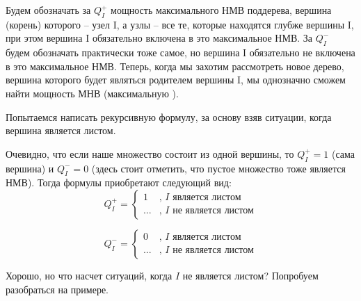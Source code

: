 \documentclass[12pt]{article}
\begin{document}
 Будем обозначать за $Q_{I}^+$ мощность максимального НМВ поддерева, вершина (корень) 
 которого -- узел I, а узлы -- все те, которые находятся глубже вершины I, при этом 
 вершина I обязательно включена в это максимальное НМВ. За $Q_{I}^-$ будем обозначать практически тоже самое,
 но вершина I обязательно не включена в это максимальное НМВ. Теперь, когда мы захотим рассмотреть новое дерево, вершина которого будет являться родителем вершины I, мы однозначно сможем найти мощность МНВ (максимальную ).

 Попытаемся написать рекурсивную формулу, за основу взяв ситуации, когда вершина является листом.

 Очевидно, что если наше множество состоит из одной вершины, то $Q_{I}^+ = 1$ (сама вершина) и $Q_{I}^- = 0$ (здесь стоит отметить, что пустое множество тоже является НМВ). 
 Тогда формулы приобретают следующий вид:
    \begin{equation*}
    Q_{I}^+ =  
     \begin{cases}
       1 &\text{, $I$ является листом}\\
       ... &\text{, $I$ не является листом}
     \end{cases}
    \end{equation*}

    \begin{equation*}
        Q_{I}^- =  
         \begin{cases}
           0 &\text{, $I$ является листом}\\
           ... &\text{, $I$ не является листом}
         \end{cases}
        \end{equation*}

Хорошо, но что насчет ситуаций, когда $I$ не является листом? Попробуем разобраться на примере.
\end{document}
